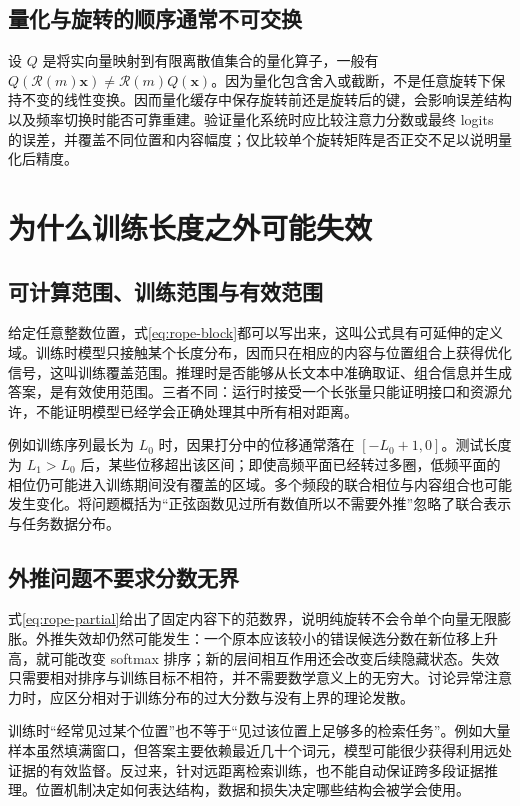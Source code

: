 \documentclass[UTF8,12pt,a4paper,fontset=fandol]{ctexart}
\begin{document}
\subsection{量化与旋转的顺序通常不可交换}
设 $Q$ 是将实向量映射到有限离散值集合的量化算子，一般有 $Q(\mathcal R(m)\mathbf x)\ne\mathcal R(m)Q(\mathbf x)$。因为量化包含舍入或截断，不是任意旋转下保持不变的线性变换。因而量化缓存中保存旋转前还是旋转后的键，会影响误差结构以及频率切换时能否可靠重建。验证量化系统时应比较注意力分数或最终 logits 的误差，并覆盖不同位置和内容幅度；仅比较单个旋转矩阵是否正交不足以说明量化后精度。

\section{为什么训练长度之外可能失效}
\label{sec:rope-extrapolation}

\subsection{可计算范围、训练范围与有效范围}
给定任意整数位置，式\eqref{eq:rope-block}都可以写出来，这叫公式具有可延伸的定义域。训练时模型只接触某个长度分布，因而只在相应的内容与位置组合上获得优化信号，这叫训练覆盖范围。推理时是否能够从长文本中准确取证、组合信息并生成答案，是有效使用范围。三者不同：运行时接受一个长张量只能证明接口和资源允许，不能证明模型已经学会正确处理其中所有相对距离。

例如训练序列最长为 $L_0$ 时，因果打分中的位移通常落在 $[-L_0+1,0]$。测试长度为 $L_1>L_0$ 后，某些位移超出该区间；即使高频平面已经转过多圈，低频平面的相位仍可能进入训练期间没有覆盖的区域。多个频段的联合相位与内容组合也可能发生变化。将问题概括为“正弦函数见过所有数值所以不需要外推”忽略了联合表示与任务数据分布。

\subsection{外推问题不要求分数无界}
式\eqref{eq:rope-partial}给出了固定内容下的范数界，说明纯旋转不会令单个向量无限膨胀。外推失效却仍然可能发生：一个原本应该较小的错误候选分数在新位移上升高，就可能改变 softmax 排序；新的层间相互作用还会改变后续隐藏状态。失效只需要相对排序与训练目标不相符，并不需要数学意义上的无穷大。讨论异常注意力时，应区分相对于训练分布的过大分数与没有上界的理论发散。

训练时“经常见过某个位置”也不等于“见过该位置上足够多的检索任务”。例如大量样本虽然填满窗口，但答案主要依赖最近几十个词元，模型可能很少获得利用远处证据的有效监督。反过来，针对远距离检索训练，也不能自动保证跨多段证据推理。位置机制决定如何表达结构，数据和损失决定哪些结构会被学会使用。
\end{document}
